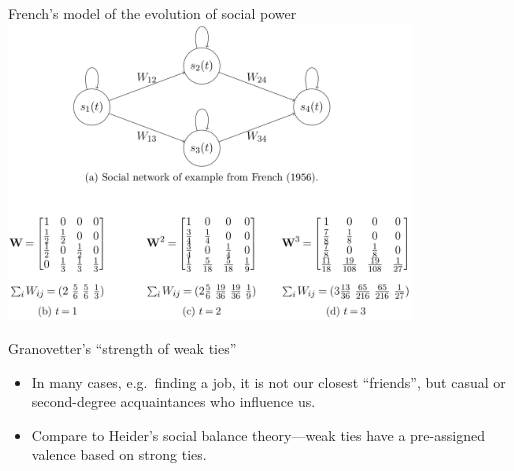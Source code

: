 \documentclass[notes]{beamer}
\begin{document}
\begin{frame}{French's model of the evolution of social power}
  \centering
  \includegraphics[width=0.8\textwidth]{Figures/FrenchPower.png}
\end{frame}

\begin{frame}{Granovetter's ``strength of weak ties''}
  \begin{itemize}
    \item In many cases, e.g.\ finding a job, it is not our closest
      ``friends'', but casual or second-degree acquaintances who influence us.
    \item Compare to Heider's social balance theory---weak ties have a
      pre-assigned valence based on strong ties.
  \end{itemize}
\end{frame}
\end{document}

